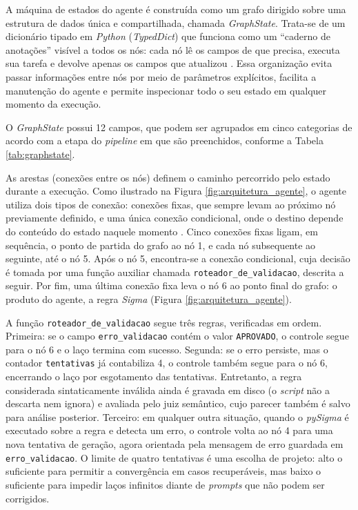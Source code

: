 A máquina de estados do agente é construída como um grafo dirigido sobre uma estrutura de dados única e compartilhada, chamada \textit{GraphState}. 
Trata-se de um dicionário tipado em \textit{Python} (\textit{TypedDict}) que funciona como um ``caderno de anotações'' visível a todos os nós: cada nó lê os campos de que precisa, executa sua tarefa e devolve apenas os campos que atualizou \cite{langgraph2024graph}. 
Essa organização evita passar informações entre nós por meio de parâmetros explícitos, facilita a manutenção do agente e permite inspecionar todo o seu estado em qualquer momento da execução.

O \textit{GraphState} possui 12 campos, que podem ser agrupados em cinco categorias de acordo com a etapa do \textit{pipeline} em que são preenchidos, conforme a Tabela \ref{tab:graphstate}.

As arestas (conexões entre os nós) definem o caminho percorrido pelo estado durante a execução. 
Como ilustrado na Figura \ref{fig:arquitetura_agente}, o agente utiliza dois tipos de conexão: conexões fixas, que sempre levam ao próximo nó previamente definido, e uma única conexão condicional, onde o destino depende do conteúdo do estado naquele momento \cite{langgraph2024graph}. 
Cinco conexões fixas ligam, em sequência, o ponto de partida do grafo ao nó 1, e cada nó subsequente ao seguinte, até o nó 5. 
Após o nó 5, encontra-se a conexão condicional, cuja decisão é tomada por uma função auxiliar chamada \texttt{roteador\_de\_validacao}, descrita a seguir. 
Por fim, uma última conexão fixa leva o nó 6 ao ponto final do grafo: o produto do agente, a regra \textit{Sigma} (Figura \ref{fig:arquitetura_agente}).

A função \texttt{roteador\_de\_validacao} segue três regras, verificadas em ordem. 
Primeira: se o campo \texttt{erro\_validacao} contém o valor \texttt{APROVADO}, o controle segue para o nó 6 e o laço termina com sucesso. 
Segunda: se o erro persiste, mas o contador \texttt{tentativas} já contabiliza 4, o controle também segue para o nó 6, encerrando o laço por esgotamento das tentativas.
Entretanto, a regra considerada sintaticamente inválida ainda é gravada em disco (o \textit{script} não a descarta nem ignora) e avaliada pelo juiz semântico, cujo parecer também é salvo para análise posterior.
Terceiro: em qualquer outra situação, quando o \textit{pySigma} é executado sobre a regra e detecta um erro, o controle volta ao nó 4 para uma nova tentativa de geração, agora orientada pela mensagem de erro guardada em \texttt{erro\_validacao}. 
O limite de quatro tentativas é uma escolha de projeto: alto o suficiente para permitir a convergência em casos recuperáveis, mas baixo o suficiente para impedir laços infinitos diante de \textit{prompts} que não podem ser corrigidos.

